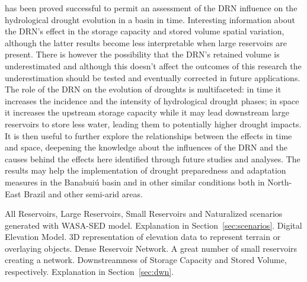 \documentclass[draft]{agujournal2019}
\begin{document}
has been proved successful to permit an assessment of the DRN influence on the hydrological drought evolution in a basin in time. Interesting information about the DRN’s effect in the storage capacity and stored volume spatial variation, although the latter results become less interpretable when large reservoirs are present. There is however the possibility that the DRN’s retained volume is underestimated and although this doesn’t affect the outcomes of this research the underestimation should be tested and eventually corrected in future applications.\\
The role of the DRN on the evolution of droughts is multifaceted: in time it increases the incidence and the intensity of hydrological drought phases; in space it increases the upstream storage capacity while it may lead downstream large reservoirs to store less water, leading them to potentially higher drought impacts. It is then useful to further explore the relationships between the effects in time and space, deepening the knowledge about the influences of the DRN and the causes behind the effects here identified through future studies and analyses. The results may help the implementation of drought preparedness and adaptation measures in the Banabuiú basin and in other similar conditions both in North-East Brazil and other semi-arid areas.


%
%
%
%


%

   \begin{acronyms}
   All Reservoirs, Large Reservoirs, Small Reservoirs and Naturalized scenarios generated with WASA-SED model. Explanation in Section~\ref{sec:scenarios}.
   Digital Elevation Model. 3D representation of elevation data to represent terrain or overlaying objects.
   Dense Reservoir Network. A great number of small reservoirs creating a network.
   Downstreamness of Storage Capacity and Stored Volume, respectively. Explanation in Section~\ref{sec:dwn}.
   \end{acronyms}
\end{document}
